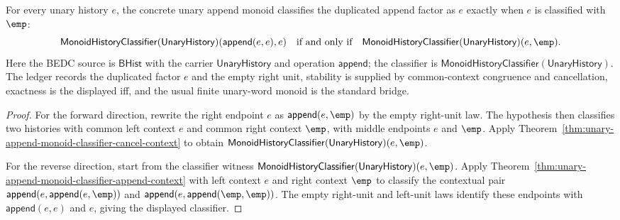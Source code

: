 \begin{theorem}
\label{thm:unary-append-monoid-idempotent-empty-iff}
For every unary history $e$, the concrete unary append monoid classifies the
duplicated append factor as $e$ exactly when $e$ is classified with $\emp$:
$$
\mathsf{MonoidHistoryClassifier}(\mathsf{UnaryHistory})
(\mathsf{append}(e,e),e)
\quad\text{if and only if}\quad
\mathsf{MonoidHistoryClassifier}(\mathsf{UnaryHistory})(e,\emp).
$$
Here the BEDC source is $\mathsf{BHist}$ with the carrier
$\mathsf{UnaryHistory}$ and operation $\mathsf{append}$; the classifier is
$\mathsf{MonoidHistoryClassifier}(\mathsf{UnaryHistory})$. The ledger records
the duplicated factor $e$ and the empty right unit, stability is supplied by
common-context congruence and cancellation, exactness is the displayed iff, and
the usual finite unary-word monoid is the standard bridge.
\end{theorem}
\begin{proof}
For the forward direction, rewrite the right endpoint $e$ as
$\mathsf{append}(e,\emp)$ by the empty right-unit law. The hypothesis then
classifies two histories with common left context $e$ and common right context
$\emp$, with middle endpoints $e$ and $\emp$. Apply
Theorem~\ref{thm:unary-append-monoid-classifier-cancel-context} to obtain
$\mathsf{MonoidHistoryClassifier}(\mathsf{UnaryHistory})(e,\emp)$.

For the reverse direction, start from the classifier witness
$\mathsf{MonoidHistoryClassifier}(\mathsf{UnaryHistory})(e,\emp)$. Apply
Theorem~\ref{thm:unary-append-monoid-classifier-append-context} with left
context $e$ and right context $\emp$ to classify the contextual pair
$\mathsf{append}(e,\mathsf{append}(e,\emp))$ and
$\mathsf{append}(e,\mathsf{append}(\emp,\emp))$. The empty right-unit and
left-unit laws identify these endpoints with $\mathsf{append}(e,e)$ and $e$,
giving the displayed classifier.
\end{proof}

